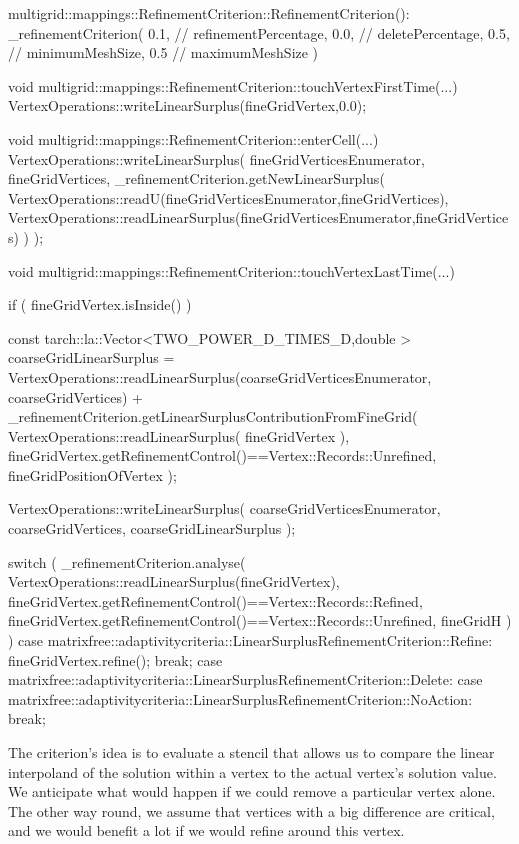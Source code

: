 \begin{code}
multigrid::mappings::RefinementCriterion::RefinementCriterion():
  _refinementCriterion(
    0.1,                   // refinementPercentage,
    0.0,                   // deletePercentage,
    0.5,                   // minimumMeshSize,
    0.5                    // maximumMeshSize
  ) {
}

void multigrid::mappings::RefinementCriterion::touchVertexFirstTime(...) {
  VertexOperations::writeLinearSurplus(fineGridVertex,0.0);
}

void multigrid::mappings::RefinementCriterion::enterCell(...) {
  VertexOperations::writeLinearSurplus(
    fineGridVerticesEnumerator,
    fineGridVertices,
    _refinementCriterion.getNewLinearSurplus(
      VertexOperations::readU(fineGridVerticesEnumerator,fineGridVertices),
      VertexOperations::readLinearSurplus(fineGridVerticesEnumerator,fineGridVertices)
    )
  );
}

void multigrid::mappings::RefinementCriterion::touchVertexLastTime(...) {
  if ( fineGridVertex.isInside() ) {
    const tarch::la::Vector<TWO_POWER_D_TIMES_D,double > coarseGridLinearSurplus =
      VertexOperations::readLinearSurplus(coarseGridVerticesEnumerator, coarseGridVertices)
      +
      _refinementCriterion.getLinearSurplusContributionFromFineGrid(
        VertexOperations::readLinearSurplus( fineGridVertex ),
        fineGridVertex.getRefinementControl()==Vertex::Records::Unrefined,
        fineGridPositionOfVertex
      );

    VertexOperations::writeLinearSurplus( coarseGridVerticesEnumerator, 
      coarseGridVertices, coarseGridLinearSurplus );

    switch (
      _refinementCriterion.analyse(
        VertexOperations::readLinearSurplus(fineGridVertex),
        fineGridVertex.getRefinementControl()==Vertex::Records::Refined,
        fineGridVertex.getRefinementControl()==Vertex::Records::Unrefined,
        fineGridH
      )
    ) {
      case matrixfree::adaptivitycriteria::LinearSurplusRefinementCriterion::Refine:
        fineGridVertex.refine();
        break;
      case matrixfree::adaptivitycriteria::LinearSurplusRefinementCriterion::Delete:
      case matrixfree::adaptivitycriteria::LinearSurplusRefinementCriterion::NoAction:
        break;
    }
  }
}
\end{code}

\noindent
The criterion's idea is to evaluate a stencil that allows us to compare the
linear interpoland of the solution within a vertex to the actual vertex's
solution value.
We anticipate what would happen if we could remove a particular vertex alone.
The other way round, we assume that vertices with a big difference are critical,
and we would benefit a lot if we would refine around this vertex.

